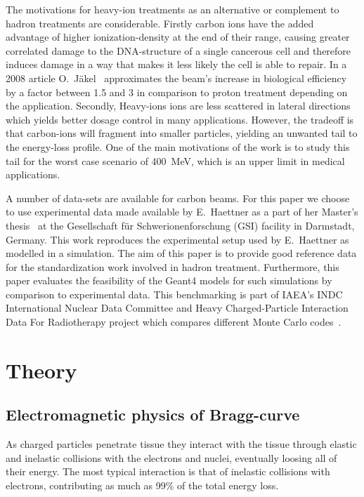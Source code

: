 The motivations for heavy-ion treatments as an alternative or complement to hadron treatments are considerable. Firstly carbon ions have the added advantage of higher ionization-density at the end of their range, causing greater correlated damage to the DNA-structure of a single cancerous cell and therefore induces damage in a way that makes it less likely the cell is able to repair. In a 2008 article O.~Jäkel~\cite{ojakel} approximates the beam's increase in biological efficiency by a factor between 1.5 and 3 in comparison to proton treatment depending on the application. Secondly, Heavy-ions ions are less scattered in lateral directions which yields better dosage control in many applications. However, the tradeoff is that carbon-ions will fragment into smaller particles, yielding an unwanted tail to the energy-loss profile. One of the main motivations of the work is to study this tail for the worst case scenario of 400~MeV, which is an upper limit in medical applications.

A number of data-sets are available for carbon beams. For this paper we choose to use experimental data made available by E.~Haettner as a part of her Master's thesis~\cite{ehaettner} at the Gesellschaft für Schwerionenforschung (GSI) facility in Darmstadt, Germany. This work reproduces the experimental setup used by E.~Haettner as modelled in a simulation. The aim of this paper is to provide good reference data for the standardization work involved in hadron treatment. Furthermore, this paper evaluates the feasibility of the Geant4 models for such simulations by comparison to experimental data. This benchmarking is part of IAEA's INDC International Nuclear Data Committee and Heavy Charged-Particle Interaction Data For Radiotherapy project which compares different Monte Carlo codes~\cite{SummaryReport}.



\clearpage
\section{Theory}

\subsection{Electromagnetic physics of Bragg-curve}
As charged particles penetrate tissue they interact with the tissue through elastic and inelastic collisions with the electrons and nuclei, eventually loosing all of their energy. The most typical interaction is that of inelastic collisions with electrons, contributing as much as 99\% of the total energy loss.

